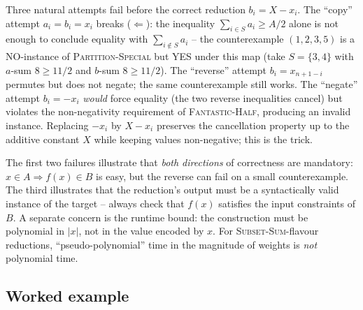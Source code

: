 \begin{remark}[Why the obvious reductions $a_i = b_i = x_i$, $b_i = x_{n+1-i}$, and $b_i = -x_i$ all fail]
Three natural attempts fail before the correct reduction $b_i = X - x_i$. The ``copy'' attempt $a_i = b_i = x_i$ breaks ($\Leftarrow$): the inequality $\sum_{i \in S} a_i \ge A/2$ alone is not enough to conclude equality with $\sum_{i \notin S} a_i$ -- the counterexample $(1, 2, 3, 5)$ is a NO-instance of \textsc{Partition-Special} but YES under this map (take $S = \{3, 4\}$ with $a$-sum $8 \ge 11/2$ and $b$-sum $8 \ge 11/2$). The ``reverse'' attempt $b_i = x_{n+1-i}$ permutes but does not negate; the same counterexample still works. The ``negate'' attempt $b_i = -x_i$ \emph{would} force equality (the two reverse inequalities cancel) but violates the non-negativity requirement of \textsc{Fantastic-Half}, producing an invalid instance. Replacing $-x_i$ by $X - x_i$ preserves the cancellation property up to the additive constant $X$ while keeping values non-negative; this is the trick.

The first two failures illustrate that \emph{both directions} of correctness are mandatory: $x \in A \Rightarrow f(x) \in B$ is easy, but the reverse can fail on a small counterexample. The third illustrates that the reduction's output must be a syntactically valid instance of the target -- always check that $f(x)$ satisfies the input constraints of $B$. A separate concern is the runtime bound: the construction must be polynomial in $|x|$, not in the value encoded by $x$. For \textsc{Subset-Sum}-flavour reductions, ``pseudo-polynomial'' time in the magnitude of weights is \emph{not} polynomial time.
\end{remark}

\subsection{Worked example}

